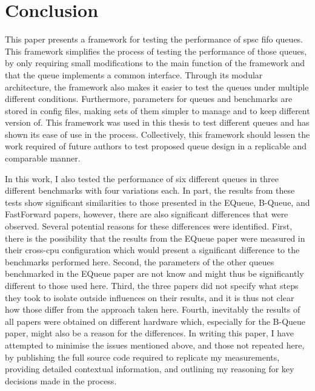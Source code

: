 \chapter{Conclusion}
This paper presents a framework for testing the performance of \acrshort{spsc} \acrshort{fifo} queues.
This framework simplifies the process of testing the performance of those queues, by only requiring small
modifications to the main function of the framework and that the queue implements a common interface.
Through its modular architecture, the framework also makes it easier to test the queues under multiple
different conditions.
Furthermore, parameters for queues and benchmarks are stored in config files, making sets of them simpler to
manage and to keep different version of.
This framework was used in this thesis to test different queues and has shown its ease of use in the process.
Collectively, this framework should lessen the work required of future authors to test proposed queue design
in a replicable and comparable manner.

In this work, I also tested the performance of six different queues in three different benchmarks with four
variations each.
In part, the results from these tests show significant similarities to those presented in the EQueue,
B-Queue, and FastForward papers, however, there are also significant differences that were
observed\cite{EQueue,B-Queue,FastForward}.
Several potential reasons for these differences were identified.
First, there is the possibility that the results from the EQueue paper were measured in their cross-cpu
configuration which would present a significant difference to the benchmarks performed here.
Second, the parameters of the other queues benchmarked in the EQueue paper are not know and might thus be
significantly different to those used here.
Third, the three papers did not specify what steps they took to isolate outside influences on their results,
and it is thus not clear how those differ from the approach taken here.
Fourth, inevitably the results of all papers were obtained on different hardware which, especially for the
B-Queue paper, might also be a reason for the differences.
In writing this paper, I have attempted to minimise the issues mentioned above, and those not repeated here,
by publishing the full source code required to replicate my measurements, providing detailed contextual
information, and outlining my reasoning for key decisions made in the process.

